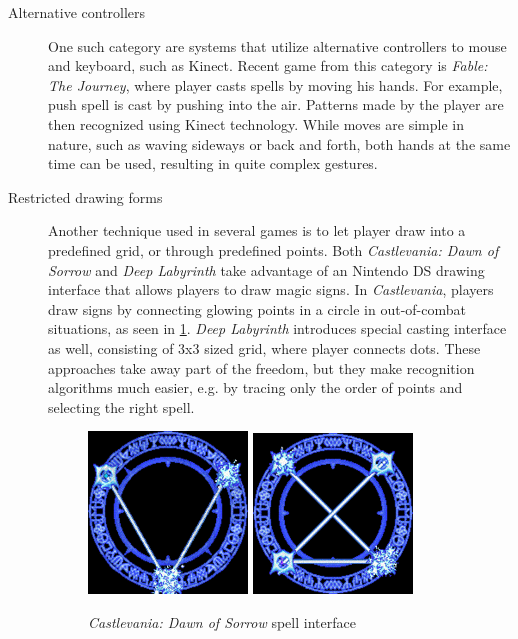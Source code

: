 \begin{description}
\item[Alternative controllers]
One such category are systems that utilize alternative controllers to mouse and keyboard, such as Kinect. Recent game from this category is \emph{Fable: The Journey}, where player casts spells by moving his hands. For example, push spell is cast by pushing into the air. Patterns made by the player are then recognized using Kinect technology. While moves are simple in nature, such as waving sideways or back and forth, both hands at the same time can be used, resulting in quite complex gestures.

\item[Restricted drawing forms]
Another technique used in several games is to let player draw into a predefined grid, or through predefined points. Both \emph{Castlevania: Dawn of Sorrow} and \emph{Deep Labyrinth} take advantage of an Nintendo DS drawing interface that allows players to draw magic signs. 
In \emph{Castlevania}, players draw signs by connecting glowing points in a circle in out-of-combat situations, as seen in \cref{fig:castlevania}. \emph{Deep Labyrinth} introduces special casting interface as well, consisting of 3x3 sized grid, where player connects dots. These approaches take away part of the freedom, but they make recognition algorithms much easier, e.g. by tracing only the order of points and selecting the right spell.

\begin{figure}
\centering
\includegraphics[width=.3\linewidth]{ext/castlevania.png}
\quad
\includegraphics[width=.3\linewidth]{ext/castlevania2.png}
\label{fig:castlevania} %
\caption{\emph{Castlevania: Dawn of Sorrow} spell interface }
\end{figure}


\end{description}
